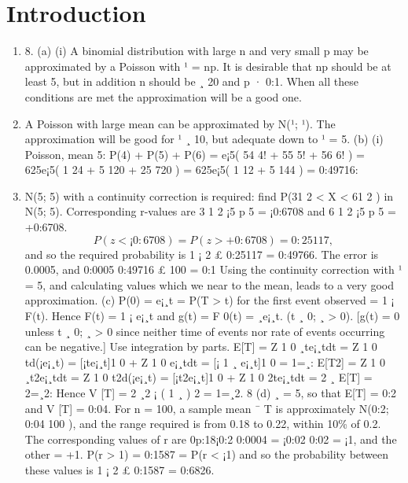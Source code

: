 \documentclass{article}
\begin{document}
\section{Introduction}
\begin{enumerate}
\item 8. (a) (i) A binomial distribution with large n and very small p may be approximated
by a Poisson with ¹ = np. It is desirable that np should be at least 5, but in
addition n should be ¸ 20 and p · 0:1. When all these conditions are met
the approximation will be a good one.
\item  A Poisson with large mean can be approximated by N(¹; ¹). The
approximation will be good for ¹ ¸ 10, but adequate down to ¹ = 5.
(b) (i) Poisson, mean 5:
P(4) + P(5) + P(6) = e¡5( 54
4! + 55
5! + 56
6! )
= 625e¡5( 1
24 + 5
120 + 25
720 ) = 625e¡5( 1
12 + 5
144 ) = 0:49716:
\item  N(5; 5) with a continuity correction is required: find P(31
2 < X < 61
2 ) in
N(5; 5). Corresponding r-values are 3 1
2
¡5
p
5
= ¡0:6708 and 6 1
2
¡5
p
5
= +0:6708.
\[P(z < ¡0:6708) = P(z > +0:6708) = 0:25117,\] and so the required probability
is 1 ¡ 2 £ 0:25117 = 0:49766. The error is 0.0005, and %
0:0005
0:49716 £ 100 = 0:1%
Using the continuity correction with ¹ = 5, and calculating values which we
near to the mean, leads to a very good approximation.
(c) P(0) = e¡¸t = P(T > t) for the first event observed = 1 ¡ F(t). Hence
F(t) = 1 ¡ e¡¸t and g(t) = F
0(t) = ¸e¡¸t. (t ¸ 0; ¸ > 0).
[g(t) = 0 unless t ¸ 0; ¸ > 0 since neither time of events nor rate of events
occurring can be negative.] Use integration by parts.
E[T] =
Z 1
0
¸te¡¸tdt =
Z 1
0
td(¡e¡¸t) = [¡te¡¸t]1
0 +
Z 1
0
e¡¸tdt
= [¡
1
¸
e¡¸t]1
0 = 1=¸:
E[T2] =
Z 1
0
¸t2e¡¸tdt =
Z 1
0
t2d(¡e¡¸t) = [¡t2e¡¸t]1
0 +
Z 1
0
2te¡¸tdt
=
2
¸
E[T] = 2=¸2:
Hence V [T] =
2
¸2
¡ (
1
¸
)
2
= 1=¸2.
8
(d) ¸ = 5, so that E[T] = 0:2 and V [T] = 0:04. For n = 100, a sample mean
¯ T is approximately N(0:2; 0:04
100 ), and the range required is from 0.18 to 0.22,
within 10\% of 0.2. The corresponding values of r are 0p:18¡0:2
0:0004
= ¡0:02
0:02 = ¡1,
and the other = +1. P(r > 1) = 0:1587 = P(r < ¡1) and so the probability
between these values is 1 ¡ 2 £ 0:1587 = 0:6826.
\end{enumerate}
\end{document}
